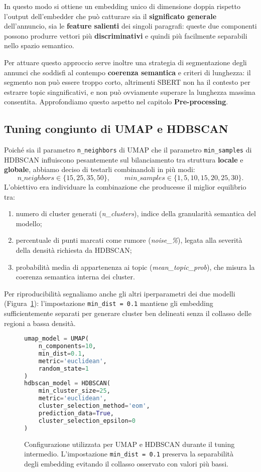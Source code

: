 In questo modo si ottiene un embedding unico di dimensione doppia rispetto l'output dell'embedder che può catturare sia il \textbf{significato generale} dell'annuncio, sia le \textbf{feature salienti} dei singoli paragrafi: queste due componenti possono produrre vettori più \textbf{discriminativi} e quindi più facilmente separabili nello spazio semantico.

Per attuare questo approccio serve inoltre una strategia di segmentazione degli annunci che soddisfi al contempo \textbf{coerenza semantica} e criteri di lunghezza: il segmento non può essere troppo corto, altrimenti SBERT non ha il contesto per estrarre topic singnificativi, e non può ovviamente superare la lunghezza massima consentita. Approfondiamo questo aspetto nel capitolo \textbf{Pre-processing}.

\subsection*{Tuning congiunto di UMAP e HDBSCAN}
Poiché sia il parametro \texttt{n\_neighbors} di UMAP che il parametro \texttt{min\_samples} di HDBSCAN influiscono pesantemente sul bilanciamento tra struttura \textbf{locale} e \textbf{globale}, abbiamo deciso di testarli combinandoli in più modi:
\[
n\_neighbors \in \{15, 25, 35, 50\}, \qquad
min\_samples \in \{1, 5, 10, 15, 20, 25, 30\}.
\]
L'obiettivo era individuare la combinazione che producesse il miglior equilibrio tra:
\begin{enumerate}
    \item numero di cluster generati (\emph{n\_clusters}), indice della granularità semantica del modello;
    \item percentuale di punti marcati come rumore (\emph{noise\_\%}), legata alla severità della densità richiesta da HDBSCAN;
    \item probabilità media di appartenenza ai topic (\emph{mean\_topic\_prob}), che misura la coerenza semantica interna dei cluster.
\end{enumerate}

Per riproducibilità segnaliamo anche gli altri iperparametri dei due modelli (Figura~\ref{fig:umap-hdbscan-config}): l’impostazione \texttt{min\_dist = 0.1} mantiene gli embedding sufficientemente separati per generare cluster ben delineati senza il collasso delle regioni a bassa densità.

\begin{figure}[H]
\centering
\begin{lstlisting}[language=Python]
umap_model = UMAP(
    n_components=10,
    min_dist=0.1,
    metric='euclidean',
    random_state=1
)
hdbscan_model = HDBSCAN(
    min_cluster_size=25,
    metric='euclidean',
    cluster_selection_method='eom',
    prediction_data=True,
    cluster_selection_epsilon=0
)
\end{lstlisting}
\caption{Configurazione utilizzata per UMAP e HDBSCAN durante il tuning intermedio. L’impostazione \texttt{min\_dist = 0.1} preserva la separabilità degli embedding evitando il collasso osservato con valori più bassi.}
\label{fig:umap-hdbscan-config}
\end{figure}

